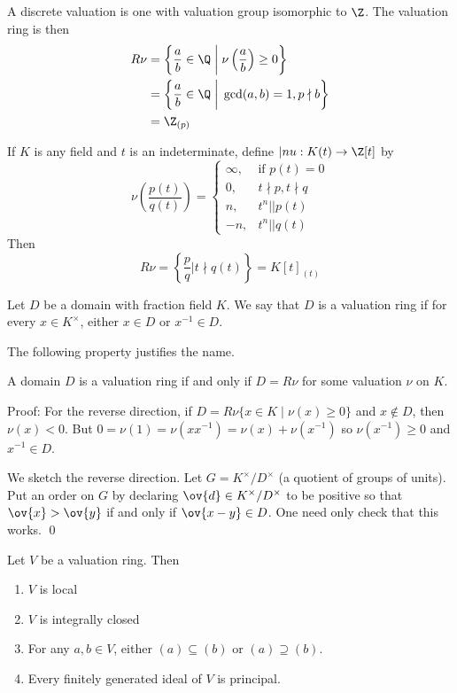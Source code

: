\begin{dfn}
A discrete valuation is one with valuation group isomorphic to $\Z$. The valuation ring is then 
\[
\begin{split}
R\nu&= \left\{ \frac{a}{b} \in \Q \; \bigg| \; \nu\left(\frac{a}{b}\right) \geq 0 \right\} \\
&=\left\{ \frac{a}{b} \in \Q \; \bigg| \; \gcd(a,b)=1, p \nmid b \right\} \\
&= \Z_{(p)} 
\end{split}
\]
\end{dfn}

\begin{ex}
If $K$ is any field and $t$ is an indeterminate, define $|nu: K(t) \to \Z[t]$ by
\[
\nu\left( \frac{p(t)}{q(t)} \right)=
\begin{cases}
\infty, & \text{if } p(t)=0 \\
0, & t \nmid p, t \nmid q \\
n, & t^n || p(t) \\
-n, & t^n || q(t)
\end{cases}
\]
Then
\[
R\nu=\left\{ \frac{p}{q} \bigg| t \nmid q(t) \right\} = K[t]_{(t)}
\]
\end{ex}

\begin{dfn}
Let $D$ be a domain with fraction field $K$. We say that $D$ is a valuation ring if for every $x \in K^\times$, either $x \in D$ or $x^{-1} \in D$. 
\end{dfn}

The following property justifies the name.

\begin{prop}
A domain $D$ is a valuation ring if and only if $D=R\nu$ for some valuation $\nu$ on $K$.
\end{prop}

\noindent Proof: For the reverse direction, if $D=R\nu\{x \in K \;|\; \nu(x) \geq 0\}$ and $x \notin D$, then $\nu(x)<0$. But $0=\nu(1)=\nu(xx^{-1})=\nu(x)+\nu(x^{-1})$ so $\nu(x^{-1}) \geq 0$ and $x^{-1} \in D$. 

We sketch the reverse direction. Let $G=K^\times/D^\times$ (a quotient of groups of units). Put an order on $G$ by declaring $\ov{d} \in K^\times/D^\times$ to be positive so that $\ov{x} > \ov{y}$ if and only if $\ov{x-y} \in D$. One need only check that this works. \qed \\

\begin{thmm}
Let $V$ be a valuation ring. Then
\begin{enumerate}
\item $V$ is local
\item $V$ is integrally closed
\item For any $a,b \in V$, either $(a) \subseteq (b)$ or $(a) \supseteq (b)$.
\item Every finitely generated ideal of $V$ is principal. 
\end{enumerate}
\end{thmm}

